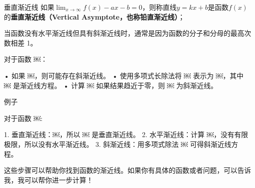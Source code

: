 \begin{definition}{垂直渐近线}
如果$\displaystyle \lim_{x\to \infty}f(x)-ax-b=0$，则称直线$y=kx+b$是函数$f(x)$的\textbf{垂直渐近线（Vertical Asymptote，也称铅直渐近线）}；
\end{definition}

当函数没有水平渐近线但具有斜渐近线时，通常是因为函数的分子和分母的最高次数相差 1。

对于函数 ￼：

	•	如果 ￼，则可能存在斜渐近线。
	•	使用多项式长除法将 ￼ 表示为 ￼，其中 ￼ 是渐近线方程。
	•	计算 ￼ 如果结果趋近于零，则 ￼ 为斜渐近线。

例子

对于函数 ￼:

	1.	垂直渐近线：￼，所以 ￼ 是垂直渐近线。
	2.	水平渐近线：计算 ￼，没有有限极限，所以没有水平渐近线。
	3.	斜渐近线：用多项式除法 ￼ 可得斜渐近线方程。

这些步骤可以帮助你找到函数的渐近线。如果你有具体的函数或者问题，可以告诉我，我可以帮你进一步计算！